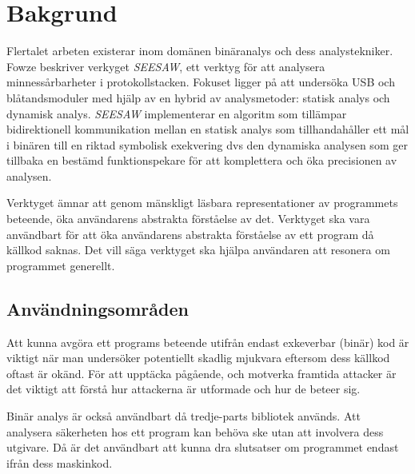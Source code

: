 \chapter{Bakgrund}



Flertalet arbeten existerar inom domänen binäranalys och dess analystekniker. Fowze \cite{fowze_mem_vul}
beskriver verkyget \emph{SEESAW}, ett verktyg för att analysera
minnessårbarheter i protokollstacken. Fokuset ligger på att undersöka USB och
blåtandsmoduler med hjälp av en hybrid av analysmetoder: statisk analys och
dynamisk analys. \emph{SEESAW} implementerar en algoritm som tillämpar
bidirektionell kommunikation mellan en statisk analys som tillhandahåller ett
mål i binären till en riktad symbolisk exekvering dvs den dynamiska analysen som
ger tillbaka en bestämd funktionspekare för att komplettera och öka precisionen
av analysen.  

Verktyget ämnar att genom mänskligt läsbara representationer av programmets 
beteende, öka användarens abstrakta förståelse av det. Verktyget ska vara 
användbart för att öka användarens abstrakta förståelse av ett program då källkod 
saknas. Det vill säga verktyget ska hjälpa användaren att resonera om programmet 
generellt. 

\section{Användningsområden}

Att kunna avgöra ett programs beteende utifrån endast exkeverbar (binär) 
kod är viktigt när man undersöker potentiellt skadlig mjukvara eftersom
dess källkod oftast är okänd. För att upptäcka pågående, och motverka 
framtida attacker är det viktigt att förstå hur attackerna är utformade och
hur de beteer sig. 

Binär analys är också användbart då tredje-parts bibliotek används.
Att analysera säkerheten hos ett program kan behöva ske utan att involvera 
dess utgivare. Då är det användbart att kunna dra slutsatser om programmet 
endast ifrån dess maskinkod. 

